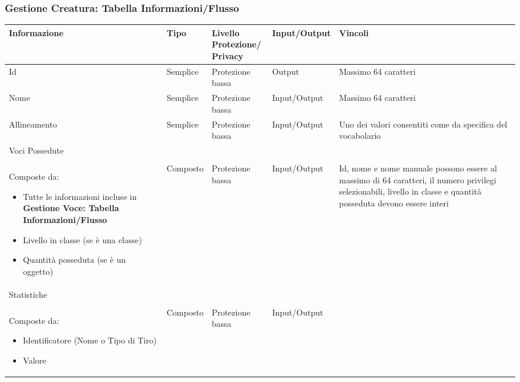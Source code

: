 \documentclass[a4paper, 11pt]{article}
\let\newline\\
\begin{document}
\vspace{2em}

\subsubsection*{Gestione Creatura: Tabella Informazioni/Flusso}
\begin{center}
\setlength\LTleft{-1cm}
\setlength\LTright{-1cm}
    \begin{longtable}{|p{4cm}|p{1.5cm}|p{3cm}|p{2.5cm}|p{4cm}|}
        \hline
        \textbf{Informazione} & \textbf{Tipo} & \textbf{Livello \newline Protezione/\newline Privacy} & \textbf{Input/Output} & \textbf{Vincoli} \\
        \hline
        Id & Semplice & Protezione bassa & Output & Massimo 64 caratteri \\
        \hline
        Nome & Semplice & Protezione bassa & Input/Output & Massimo 64 caratteri \\
        \hline
        Allineamento & Semplice & Protezione bassa & Input/Output & Uno dei valori consentiti come da specifica del vocabolario \\
        \hline
        Voci Possedute \newline \newline Composte da:
        \begin{itemize}
            \item Tutte le informazioni incluse in \textbf{Gestione Voce: Tabella Informazioni/Flusso}
            \item Livello in classe (se è una classe)
            \item Quantità posseduta (se è un oggetto)
        \end{itemize}
        & Composto & Protezione bassa & Input/Output & Id, nome e nome manuale possono essere al massimo di 64 caratteri, il numero privilegi selezionabili, livello in classe e quantità posseduta devono essere interi \\
        \hline
        Statistiche \newline \newline Composte da: \begin{itemize}
            \item Identificatore (Nome o Tipo di Tiro)
            \item Valore
        \end{itemize}& Composto & Protezione bassa & Input/Output & \\

\end{longtable}
\end{center}
\end{document}
